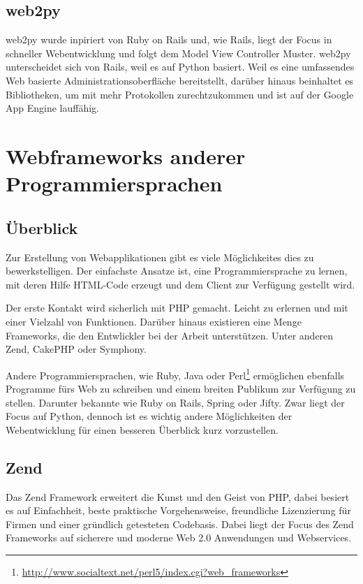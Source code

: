 \subsection{web2py}
web2py wurde inpiriert von Ruby on Rails und, wie Rails, liegt der Focus in
schneller Webentwicklung und folgt dem Model View Controller Muster. web2py
unterscheidet sich von Rails, weil es auf Python basiert. Weil es eine
umfassendes Web basierte Administrationsoberfläche bereitstellt, darüber hinaus
beinhaltet es Bibliotheken, um mit mehr Protokollen zurechtzukommen und ist auf
der Google App Engine lauffähig.\cite{web2py} 


\section{Webframeworks anderer Programmiersprachen}
\subsection{Überblick}
Zur Erstellung von Webapplikationen gibt es viele Möglichkeites dies zu
bewerkstelligen. Der einfachste Ansatze ist, eine Programmiersprache zu lernen,
mit deren Hilfe HTML-Code erzeugt und dem Client zur Verfügung gestellt
wird.

Der erste Kontakt wird sicherlich mit PHP gemacht. Leicht zu erlernen und
mit einer Vielzahl von Funktionen. Darüber hinaus existieren eine Menge
Frameworks, die den Entwlickler bei der Arbeit unterstützen. Unter anderen Zend,
CakePHP oder Symphony.

Andere Programmiersprachen, wie Ruby, Java oder
Perl\footnote{\url{http://www.socialtext.net/perl5/index.cgi?web_frameworks}} 
ermöglichen ebenfalls Programme fürs Web zu schreiben und einem breiten 
Publikum zur Verfügung zu stellen. Darunter bekannte wie Ruby on Rails, Spring 
oder Jifty. Zwar liegt der Focus auf Python, dennoch ist es wichtig andere 
Möglichkeiten der Webentwicklung für einen besseren Überblick kurz vorzustellen.

\subsection{Zend}
Das Zend Framework erweitert die Kunst und den Geist von PHP, dabei besiert es
auf Einfachheit, beste praktische Vorgehensweise, freundliche Lizenzierung für
Firmen und einer gründlich getesteten Codebasis. Dabei liegt der Focus des Zend
Frameworks auf sicherere und moderne Web 2.0 Anwendungen und Webservices.
\cite{zend}

